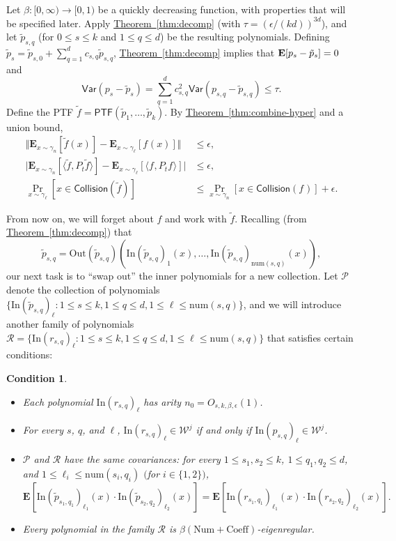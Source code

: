 \documentclass[11pt]{article}
\numberwithin{equation}{section}
\theoremstyle{definition}
\theoremstyle{plain}
\newcommand{\expref}[2]{\hyperref[#2]{#1~\ref{#2}}}
\newcommand{\E}{{\bf E}}
\newcommand{\Inner}{\mathrm{In}}
\newcommand{\Outer}{\mathrm{Out}}
\newcommand{\num}{\mathrm{num}}
\newtheorem{cond}[theorem]{Condition}
\begin{document}
Let $\beta: [0, \infty) \to [0, 1)$ be a quickly decreasing function, with
properties that will be specified later. Apply \expref{Theorem}{thm:decomp}
(with $\tau = (\epsilon / (kd))^{3d}$), and let $\tilde p_{s,q}$ (for $0 \le s \le k$ and $1 \le q \le d$) be the resulting polynomials. Defining $\tilde p_s = \tilde p_{s,0} + \sum_{q=1}^d c_{s,q} \tilde p_{s,q}$, \expref{Theorem}{thm:decomp} implies that $\E[p_s - \tilde p_s] = 0$ and
\[
\mathsf{Var}(p_s - \tilde{p}_s) = \sum_{q=1}^d c_{s,q}^2 \mathsf{Var}(p_{s,q} - \tilde{p}_{s,q})  \le \tau. 
\]
Define the PTF $\tilde{f} = \mathsf{PTF}(\tilde{p}_1, \ldots, \tilde{p}_k)$. By
\expref{Theorem}{thm:combine-hyper} and a union bound, 
\begin{align*}
\Vert \mathbf{E}_{x \sim \gamma_n} [\tilde{f}(x) ] - \mathbf{E}_{x \sim \gamma_\ell} [f_{}(x)  ] \Vert&\le\epsilon,  \\
\big| \mathbf{E}_{x \sim \gamma_n} [ \langle \tilde{f}, P_t  \tilde{f} \rangle ] - \mathbf{E}_{x \sim \gamma_{\ell}} [\langle f_{}, P_t f_{}\rangle ] \big| &\le \epsilon, \\ 
\Pr_{x \sim \gamma_{\ell}} [x \in \mathsf{Collision}(\tilde{f})] &\le \Pr_{x \sim \gamma_{n}} [x \in \mathsf{Collision}(f_{})] + \epsilon.
\end{align*}

{}From now on, we will forget about $f$ and work with $\tilde{f}$. Recalling (from \expref{Theorem}{thm:decomp}) that
$$
\tilde{p}_{s,q} = \Outer(\tilde p_{s,q})\left(
\Inner(\tilde p_{s,q})_1(x),\dots, \Inner(\tilde p_{s,q})_{\num({s,q})}(x)\right),
$$
our next task is to ``swap out'' the inner polynomials for a new collection.
Let $\mathcal{P}$ denote the collection of polynomials
$\{\Inner(\tilde p_{s,q})_\ell: 1 \le s \le k, 1 \le q \le d, 1 \le \ell \le \num(s,q)\}$, and
we will introduce another family of polynomials $\mathcal{R} =
\{\Inner(r_{s,q})_\ell: 1 \le s \le k, 1 \le q \le d, 1 \le \ell \le \num(s,q)\}$
that satisfies certain conditions:
\begin{cond}\label{cond:junta} $ $
\begin{itemize}
    \item Each polynomial $\Inner(r_{s,q})_\ell$ has arity $n_0 = O_{s,k,\beta,\epsilon}(1)$.
\item For every $s$, $q$, and $\ell$, $\Inner(r_{s,q})_\ell \in \mathcal{W}^j$ if and only if $\Inner(p_{s,q})_\ell \in \mathcal{W}^j$.
\item $\mathcal{P}$ and $\mathcal{R}$ have the same covariances:
    for every $1 \le s_1, s_2 \le k$, $1 \le q_1, q_2 \le d$, and $1 \le \ell_i \leq \num(s_i, q_i)$ $($for $i \in \{1,2\})$, 
\[
\mathbf{E}[\Inner(\tilde p_{s_1,q_1})_{\ell_1}(x) \cdot \Inner(\tilde p_{s_2,q_2})_{\ell_2}(x) ] = \mathbf{E}[\Inner(r_{s_1,q_1})_{\ell_1}(x) \cdot \Inner(r_{s_2,q_2})_{\ell_2}(x) ].
\]
\item Every polynomial in the family $\mathcal{R}$ is $\beta(\mathrm{Num} + \mathrm{Coeff})$-eigenregular. 
\end{itemize}
\end{cond}
\end{document}
